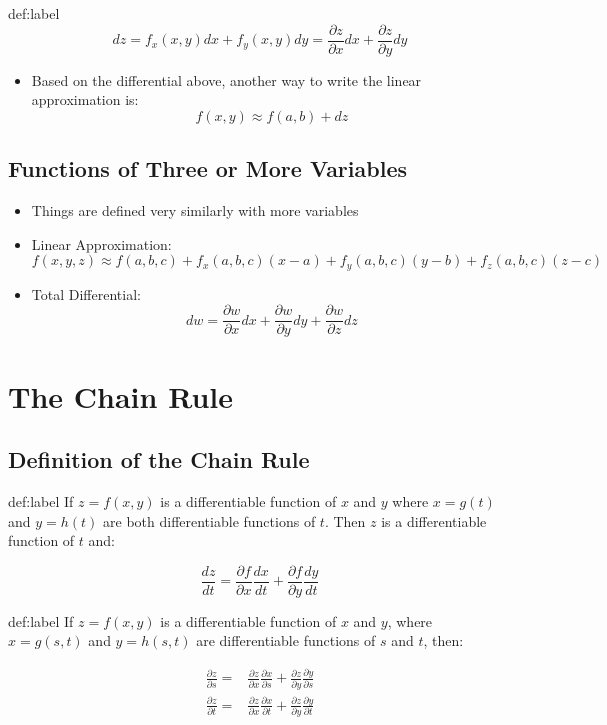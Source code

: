 \documentclass{package/notes}
\begin{document}
\begin{definition}[Differentials]{def:label}
	$$dz = f_x(x,y)dx+f_y(x,y)dy=\frac{\partial z}{\partial x}dx + \frac{\partial z}{\partial y}dy$$
\end{definition}

\begin{itemize}
	\item Based on the differential above, another way to write the linear approximation is: $$f(x,y) \approx f(a,b) + dz$$
\end{itemize}


\subsection{Functions of Three or More Variables}

\begin{itemize}
	\item Things are defined very similarly with more variables
	\item Linear Approximation: $$f(x,y,z) \approx f(a,b,c)+f_x(a,b,c)(x-a)+f_y(a,b,c)(y-b)+f_z(a,b,c)(z-c)$$
	\item Total Differential: $$dw = \frac{\partial w}{\partial x}dx + \frac{\partial w}{\partial y}dy + \frac{\partial w}{\partial z}dz$$
\end{itemize}



\section{The Chain Rule}

\subsection{Definition of the Chain Rule}

\begin{definition}{def:label}
	If $z = f(x,y)$ is a differentiable function of $x$ and $y$ where $x = g(t)$ and $y = h(t)$ are both differentiable functions of $t$. Then $z$ is a differentiable function of $t$ and:

	$$\frac{dz}{dt}=\frac{\partial f}{\partial x}\frac{dx}{dt}+\frac{\partial f}{\partial y}\frac{dy}{dt}$$
\end{definition}

\begin{definition}{def:label}
	If $z = f(x,y)$ is a differentiable function of $x$ and $y$, where $x = g(s,t)$ and $y = h(s,t)$ are differentiable functions of $s$ and $t$, then:

	$$
	\begin{aligned}
		\frac{\partial z}{\partial s}=&\frac{\partial z}{\partial x}\frac{\partial x}{\partial s}+\frac{\partial z}{\partial y}\frac{\partial y}{\partial s}\\
		\frac{\partial z}{\partial t}=&\frac{\partial z}{\partial x}\frac{\partial x}{\partial t}+\frac{\partial z}{\partial y}\frac{\partial y}{\partial t}	
	\end{aligned}
	$$
\end{definition}
\end{document}
